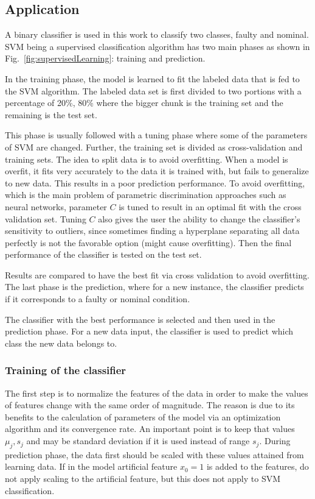  
\subsection{Application}


A binary classifier is used in this work to classify two classes, faulty and nominal. 
SVM being a supervised classification algorithm has two main phases as shown in Fig.~\ref{fig:supervisedLearning}: training and prediction. 


In the training phase, the model is learned to fit the labeled data that is fed to the SVM algorithm. The labeled data set is first divided to two portions with a percentage of 20\%, 80\% where the bigger chunk is the training set and the remaining is the test set. 

This phase is usually followed with a tuning phase where some of the parameters of SVM are changed. Further, the training set is divided as cross-validation and training sets. The idea to split data is to avoid overfitting. When a model is overfit, it fits very accurately to the data it is trained with, but fails to generalize to new data. This results in a poor prediction performance. To avoid overfitting, which is the main problem of parametric discrimination approaches such as neural networks, parameter $C$ is tuned to result in an optimal fit with the cross validation set. Tuning $C$ also gives the user the ability to change the classifier's sensitivity to outliers, since sometimes finding a hyperplane separating all data perfectly is not the favorable option (might cause overfitting). Then the final performance of the classifier is tested on the test set. 

Results are compared to have the best fit via cross validation to avoid overfitting. The last phase is the prediction, where for a new instance, the classifier predicts if it corresponds to a faulty or nominal condition.


The classifier with the best performance is selected and then used in the prediction phase.  
For a new data input, the classifier is used to predict which class the new data belongs to.



\subsubsection{Training of the classifier}

The first step is to normalize the features of the data in order to make the values of features change with the same order of magnitude. 
The reason is due to its benefits to the calculation of parameters of the model via an optimization algorithm and its convergence rate.  
An important point is to keep that values $\mu_j, s_j$ and may be standard deviation if it is used instead of range $s_j$. 
During prediction phase, the data first should be scaled with these values attained from learning data.
If in the model artificial feature  $x_0 = 1$ is added to the features, do not apply scaling to the artificial feature, but this does not apply to SVM classification.

